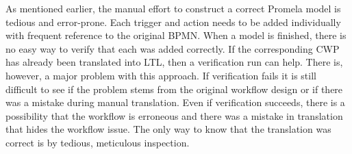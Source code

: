 As mentioned earlier, the manual effort to construct a correct Promela model is tedious and error-prone. Each trigger and action needs to be added individually with frequent reference to the original BPMN. When a model is finished, there is no easy way to verify that each was added correctly. If the corresponding CWP has already been translated into LTL, then a verification run can help. There is, however, a major problem with this approach. If verification fails it is still difficult to see if the problem stems from the original workflow design or if there was a mistake during manual translation. Even if verification succeeds, there is a possibility that the workflow is erroneous and there was a mistake in translation that hides the workflow issue. The only way to know that the translation was correct is by tedious, meticulous inspection.